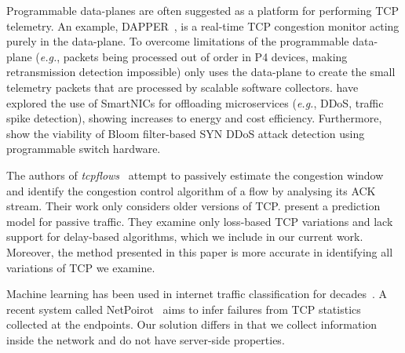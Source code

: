 
Programmable data-planes are often suggested as a platform for performing TCP telemetry. An example, DAPPER~\parencite{DBLP:conf/sosr/GhasemiBR17}, is a real-time TCP congestion monitor acting purely in the data-plane. To overcome limitations of the programmable data-plane (\emph{e.g.}, packets being processed out of order in P4 devices, making retransmission detection impossible) \seidr{} only uses the data-plane to create the small telemetry packets that are processed by scalable software collectors.
\Textcite{DBLP:conf/usenix/LiuPKP19} have explored the use of SmartNICs for offloading microservices (\emph{e.g.}, DDoS, traffic spike detection), showing increases to energy and cost efficiency.
Furthermore, \textcite{DBLP:conf/sc/HillAG18} show the viability of Bloom filter-based SYN DDoS attack detection using programmable switch hardware.

The authors of \emph{tcpflows}~\parencite{rewaskar2006passive} attempt to passively estimate the congestion window and identify the congestion control algorithm of a flow by analysing its ACK stream. Their work only considers older versions of TCP. \Textcite{DBLP:conf/icccn/HagosEYK18} present a prediction model for passive traffic. They examine only loss-based TCP variations and lack support for delay-based algorithms, which we include in our current work. Moreover, the method presented in this paper is more accurate in identifying all variations of TCP we examine.


Machine learning has been used in internet traffic classification for decades~\parencite{nguyen2008survey}. A recent system called NetPoirot~\parencite{arzani2016taking} aims to infer failures from TCP statistics collected at the endpoints. Our solution differs in that we collect information inside the network and do not have server-side properties.

